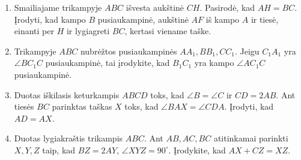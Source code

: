 \begin{enumerate}
\item Smailiajame trikampyje $ABC$ išvesta aukštinė $CH$.  Pasirodė, kad
  $AH = BC$. Įrodyti, kad kampo $B$ pusiaukampinė, aukštinė $AF$ iš kampo
  $A$ ir tiesė, einanti per $H$ ir lygiagreti $BC$, kertasi viename taške.
\item Trikampyje $ABC$ nubrėžtos pusiaukampinės $AA_1, BB_1, CC_1$. Jeigu
  $C_1A_1$ yra $\angle BC_1C$ pusiaukampinė, tai įrodykite, kad $B_1C_1$
  yra kampo $\angle AC_1C$ pusiaukampinė.
\item Duotas iškilasis keturkampis $ABCD$ toks, kad $\angle B = \angle C$
  ir $CD = 2AB$. Ant tiesės $BC$ parinktas taškas $X$ toks, kad $\angle BAX
  = \angle CDA$. Įrodyti, kad $AD = AX$.
\item Duotas lygiakraštis trikampis $ABC$. Ant $AB, AC, BC$ atitinkamai
  parinkti $X, Y, Z$ taip, kad $BZ = 2AY$, $\angle XYZ = 90^\circ$.
  Įrodykite, kad $AX + CZ = XZ$.

\end{enumerate}
